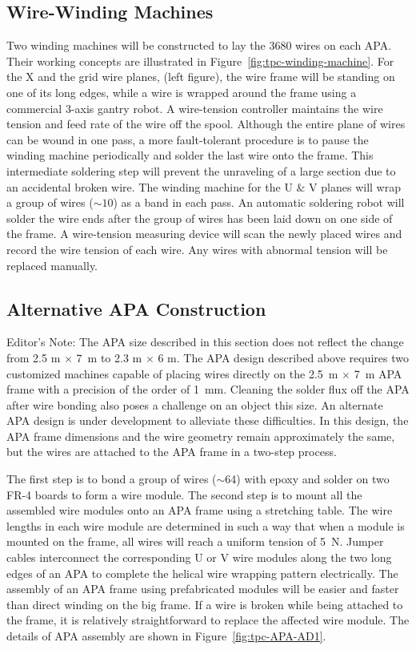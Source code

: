 \subsection{Wire-Winding Machines}

Two winding machines will be constructed to lay the 3680 wires on each APA. 
Their working concepts are illustrated in Figure~\ref{fig:tpc-winding-machine}. 
For the X and the grid wire planes, (left figure), the wire frame will be standing on 
one of its long edges, while a wire is wrapped around the frame using a commercial
3-axis gantry robot. A wire-tension controller maintains the wire 
tension and feed rate of the wire off the spool. Although the entire plane of 
wires can be wound in one pass, a more fault-tolerant procedure is to 
pause the winding machine periodically and solder the last wire onto the frame.
This intermediate soldering step will prevent the unraveling of a large section 
due to an accidental broken wire.  
The winding machine for the U \& V planes will wrap a group of wires ($\sim 10$) as a band in each pass.
An automatic soldering robot will solder the wire ends after the group of wires has been laid down on one side of the frame. 
A wire-tension measuring device will scan the newly placed wires and record 
the wire tension of each wire. Any wires with abnormal tension will be 
replaced manually.  

\subsection{Alternative APA Construction}
\notestart
Editor's Note:  The APA size described in this section does not reflect the change from 2.5 m $\times$ 7~m  to 2.3 m $\times$ 6 m.
\notestop
The APA design described above requires two customized machines capable of placing wires directly on the 2.5~m $\times$ 7~m APA frame with a precision of the order of 1~mm.  Cleaning the solder flux off the APA after wire bonding also poses a challenge on an object this size. An alternate APA design is under development to alleviate these difficulties.  In this design, the APA frame dimensions and the wire geometry remain  approximately the same, but the wires are attached to the APA frame in a two-step process.

The first step is to bond a group of wires ($\sim$64) with epoxy and solder on two FR-4 boards to form a wire module.   The second step is to mount all the assembled wire modules onto an APA frame using a stretching table.  The wire lengths in each wire module are determined in such a way that when a module is mounted on the frame, all wires will reach a uniform tension of 5~N.  Jumper cables interconnect the corresponding U or V wire modules along the two long edges of an APA to complete the helical wire wrapping pattern electrically.
The assembly of an APA frame  using prefabricated modules will be easier and faster than direct winding on the big frame.  If a wire is broken while being attached to the frame, it is relatively straightforward to replace the affected wire module. The details of APA assembly are shown in Figure~\ref{fig:tpc-APA-AD1}.  
 
